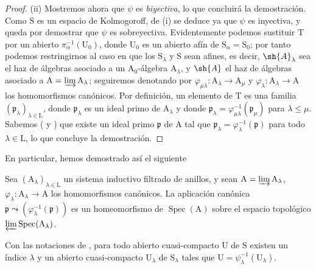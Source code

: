 \begin{proof}
\medskip
\noindent
(ii) Mostremos ahora que $\psi$ es \emph{biyectiva}, lo que concluirá la demostración.
Como $\mathrm{S}$ es un espacio de Kolmogoroff, de (i) se deduce ya que $\psi$ es inyectiva, y queda por demostrar que $\psi$ es sobreyectiva.
Evidentemente podemos sustituir $\mathrm{T}$ por un abierto $\pi_\alpha^{-1}(\mathrm{U}_0)$, donde $\mathrm{U}_0$ es un abierto afín de $\mathrm{S}_\alpha=\mathrm{S}_0$; por tanto podemos restringirnos al caso en que los $\mathrm{S}_\lambda$ y $\mathrm{S}$ sean afines, es decir, $\sh{A}_\lambda$ sea el haz de álgebras asociado a un $\mathrm{A}_0$-álgebra $\mathrm{A}_\lambda$, y $\sh{A}$ el haz de álgebras asociado a $\mathrm{A}=\varinjlim\mathrm{A}_\lambda$; seguiremos denotando por $\varphi_{\mu\lambda}:\mathrm{A}_\lambda\to\mathrm{A}_\mu$ y $\varphi_\lambda:\mathrm{A}_\lambda\to\mathrm{A}$ los homomorfismos canónicos.
Por definición, un elemento de $\mathrm{T}$ es una familia $(\mathfrak{p}_\lambda)_{\lambda\in\mathrm{L}}$, donde $\mathfrak{p}_\lambda$ es un ideal primo de $\mathrm{A}_\lambda$ y donde $\mathfrak{p}_\lambda=\varphi_{\mu\lambda}^{-1}(\mathfrak{p}_\mu)$ para $\lambda\leqslant\mu$.
Sabemos ( y ) que existe un ideal primo $\mathfrak{p}$ de $\mathrm{A}$ tal que $\mathfrak{p}_\lambda=\varphi_\lambda^{-1}(\mathfrak{p})$ para todo $\lambda\in\mathrm{L}$, lo que concluye la demostración.
\end{proof}

En particular, hemos demostrado así el siguiente

\begin{corollary}[8.2.10]
\label{IV.8.2.10}
Sea $(\mathrm{A}_\lambda)_{\lambda\in\mathrm{L}}$ un sistema inductivo filtrado de anillos, y sean $\mathrm{A}=\varinjlim\mathrm{A}_\lambda$, $\varphi_\lambda:\mathrm{A}_\lambda\to\mathrm{A}$ los homomorfismos canónicos.
La aplicación canónica $\mathfrak{p}\leadsto(\varphi_\lambda^{-1}(\mathfrak{p}))$ es un homeomorfismo de $\operatorname{Spec}(\mathrm{A})$ sobre el espacio topológico $\varprojlim\operatorname{Spec}(\mathrm{A}_\lambda)$.
\end{corollary}

\begin{corollary}[8.2.11]
\label{IV.8.2.11}
Con las notaciones de , para todo abierto cuasi-compacto $\mathrm{U}$ de $\mathrm{S}$ existen un índice $\lambda$ y un abierto cuasi-compacto $\mathrm{U}_\lambda$ de $\mathrm{S}_\lambda$ tales que $\mathrm{U}=\psi_\lambda^{-1}(\mathrm{U}_\lambda)$.
\end{corollary}

